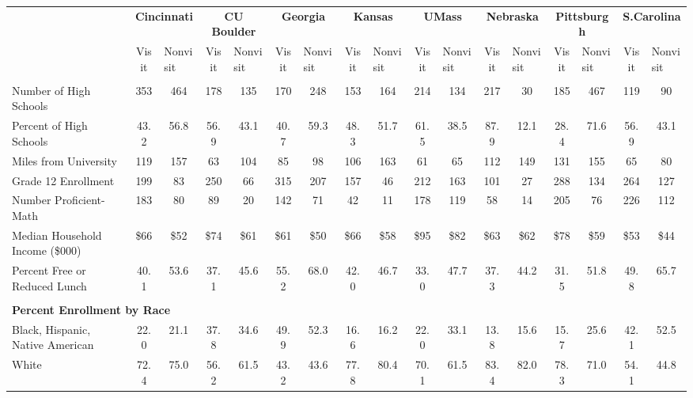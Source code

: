 \begin{tabular*}{\linewidth}{@{\extracolsep{\fill} } lcccccccccccccccc}%
&\multicolumn{2}{c}{\bfseries Cincinnati}&\multicolumn{2}{c}{\bfseries CU Boulder}&\multicolumn{2}{c}{\bfseries Georgia}&\multicolumn{2}{c}{\bfseries Kansas}&\multicolumn{2}{c}{\bfseries UMass}&\multicolumn{2}{c}{\bfseries Nebraska}&\multicolumn{2}{c}{\bfseries Pittsburgh}&\multicolumn{2}{c}{\bfseries S.Carolina}\\%
&Visit&\multicolumn{1}{l}{Nonvisit}&Visit&\multicolumn{1}{l}{Nonvisit}&Visit&\multicolumn{1}{l}{Nonvisit}&Visit&\multicolumn{1}{l}{Nonvisit}&Visit&\multicolumn{1}{l}{Nonvisit}&Visit&\multicolumn{1}{l}{Nonvisit}&Visit&\multicolumn{1}{l}{Nonvisit}&Visit&\multicolumn{1}{l}{Nonvisit}\\%
\hline%
&&&&&&&&&&&&&&&&\\%
\hspace{0cm}Number of High Schools&353&464&178&135&170&248&153&164&214&134&217&30&185&467&119&90\\%
Percent of High Schools&43.2&56.8&56.9&43.1&40.7&59.3&48.3&51.7&61.5&38.5&87.9&12.1&28.4&71.6&56.9&43.1\\%
\hspace{0cm}Miles from University&119&157&63&104&85&98&106&163&61&65&112&149&131&155&65&80\\%
\hspace{0cm}Grade 12 Enrollment&199&83&250&66&315&207&157&46&212&163&101&27&288&134&264&127\\%
\hspace{0cm}Number Proficient{-}Math&183&80&89&20&142&71&42&11&178&119&58&14&205&76&226&112\\%
\hspace{0cm}Median Household Income (\$000)&\$66&\$52&\$74&\$61&\$61&\$50&\$66&\$58&\$95&\$82&\$63&\$62&\$78&\$59&\$53&\$44\\%
\hspace{0cm}Percent Free or Reduced Lunch&40.1&53.6&37.1&45.6&55.2&68.0&42.0&46.7&33.0&47.7&37.3&44.2&31.5&51.8&49.8&65.7\\%
&&&&&&&&&&&&&&&&\\%
\multicolumn{17}{l}{\bfseries Percent Enrollment by Race}\\%
\hspace{0.2cm}Black, Hispanic, Native American&22.0&21.1&37.8&34.6&49.9&52.3&16.6&16.2&22.0&33.1&13.8&15.6&15.7&25.6&42.1&52.5\\%
\hspace{0.2cm}White&72.4&75.0&56.2&61.5&43.2&43.6&77.8&80.4&70.1&61.5&83.4&82.0&78.3&71.0&54.1&44.8\\%

\end{tabular*}
